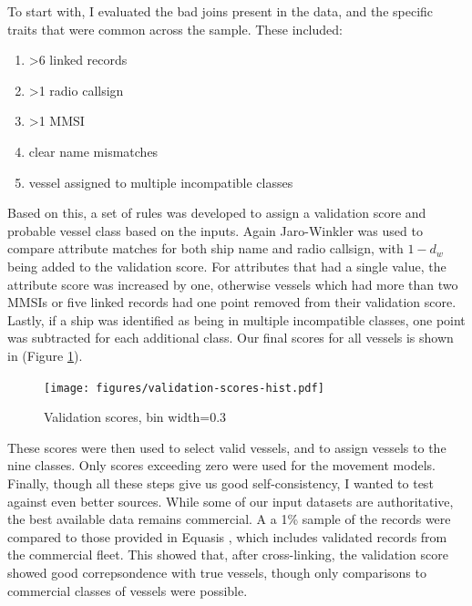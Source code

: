To start with, I evaluated the bad joins present in the data, and the specific traits that were common across the sample. These included:
\begin{enumerate}[noitemsep]
 \item >6 linked records
 \item >1 radio callsign
 \item >1 MMSI
 \item clear name mismatches
 \item vessel assigned to multiple incompatible classes
\end{enumerate}

Based on this, a set of rules was developed to assign a validation score and probable vessel class based on the inputs.  Again Jaro-Winkler was used to compare attribute matches for both ship name and radio callsign, with $1 - d_w$ being added to the validation score. For attributes that had a single value, the attribute score was increased by one, otherwise vessels which had more than two MMSIs or five linked records had one point removed from their validation score. Lastly, if a ship was identified as being in multiple incompatible classes, one point was subtracted for each additional class. Our final scores for all vessels is shown in (Figure \ref{fig:validation-score-hist}).

\begin{figure}[h!]
  \centering
    \texttt{[image: figures/validation-scores-hist.pdf]}
  \caption {Validation scores, bin width=0.3}
  \label{fig:validation-score-hist}
\end{figure}

These scores were then used to select valid vessels, and to assign vessels to the nine classes. Only scores exceeding zero were used for the movement models. Finally, though all these steps give us good self-consistency, I wanted to test against even better sources.  %
While some of our input datasets are authoritative, the best available data remains commercial. A a 1\% sample of the records were compared to those provided in Equasis \citep{Equasis2011}, which includes validated records from the commercial fleet. This showed that, after cross-linking, the validation score showed good correpsondence with true vessels, though only comparisons to commercial classes of vessels were possible.

